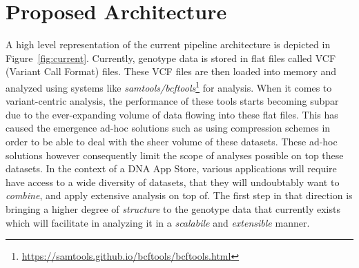 \documentclass[conference,twocolumn,10pt]{IEEEtran}
\begin{document}




\section{Proposed Architecture}

A high level representation of the current pipeline architecture is depicted in Figure~\ref{fig:current}. Currently, genotype data is stored in flat files called VCF (Variant Call Format) files. These VCF files are then loaded into memory and analyzed using systems like \textit{samtools/bcftools}\footnote{\small \url{https://samtools.github.io/bcftools/bcftools.html}} for analysis. When it comes to variant-centric analysis, the performance of these tools starts becoming subpar due to the ever-expanding volume of data flowing into these flat files. This has caused the emergence ad-hoc solutions such as using compression schemes in order to be able to deal with the sheer volume of these datasets. These ad-hoc solutions however consequently limit the scope of analyses possible on top these datasets. In the context of a DNA App Store, various applications will require have access to a wide diversity of datasets, that they will undoubtably want to \textit{combine}, and apply extensive analysis on top of. The first step in that direction is bringing a higher degree of \textit{structure} to the genotype data that currently exists which will facilitate in analyzing it in a \textit{scalabile} and \textit{extensible} manner.
\end{document}

